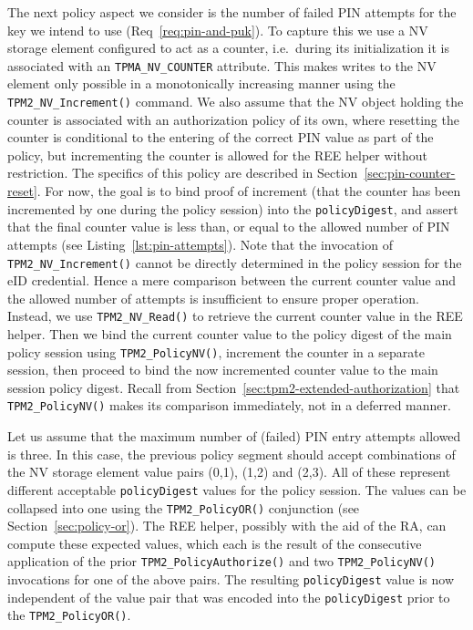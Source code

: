 \documentclass{sig-alternate-2013}
\begin{document}
The next policy aspect we consider is the number of failed PIN attempts for the
key we intend to use (Req~\ref{req:pin-and-puk}). To capture this we use a NV
storage element configured to act as a counter, i.e.\ during its initialization
it is associated with an \texttt{TPMA\_NV\_COUNTER} attribute. This makes writes
to the NV element only possible in a monotonically increasing manner using the
\texttt{TPM2\_NV\_Increment()} command. We also assume that the NV object
holding the counter is associated with an authorization policy of its own, where
resetting the counter is conditional to the entering of the correct PIN value as
part of the policy, but incrementing the counter is allowed for the REE helper
without restriction. The specifics of this policy are described in
Section~\ref{sec:pin-counter-reset}. For now, the goal is to bind proof of
increment (that the counter has been incremented by one during the policy
session) into the \texttt{policyDigest}, and assert that the final counter value
is less than, or equal to the allowed number of PIN attempts (see
Listing~\ref{lst:pin-attempts}). Note that the invocation of
\texttt{TPM2\_NV\_Increment()} cannot be directly determined in the policy
session for the eID credential. Hence a mere comparison between the current
counter value and the allowed number of attempts is insufficient to ensure
proper operation. Instead, we use \texttt{TPM2\_NV\_Read()} to retrieve the
current counter value in the REE helper. Then we bind the current counter value
to the policy digest of the main policy session using \texttt{TPM2\_PolicyNV()},
increment the counter in a separate session, then proceed to bind the now
incremented counter value to the main session policy digest. Recall from
Section~\ref{sec:tpm2-extended-authorization} that \texttt{TPM2\_PolicyNV()}
makes its comparison immediately, not in a deferred manner.

Let us assume that the maximum number of (failed) PIN entry attempts allowed is
three. In this case, the previous policy segment should accept combinations of
the NV storage element value pairs (0,1), (1,2) and (2,3).  All of these
represent different acceptable \texttt{policyDigest} values for the policy
session. The values can be collapsed into one using the
\texttt{TPM2\_PolicyOR()} conjunction (see Section~\ref{sec:policy-or}). The REE
helper, possibly with the aid of the RA, can compute these expected values,
which each is the result of the consecutive application of the prior
\texttt{TPM2\_PolicyAuthorize()} and two \texttt{TPM2\_PolicyNV()} invocations
for one of the above pairs. The resulting \texttt{policyDigest} value is now
independent of the value pair that was encoded into the \texttt{policyDigest}
prior to the \texttt{TPM2\_PolicyOR()}.
\end{document}
